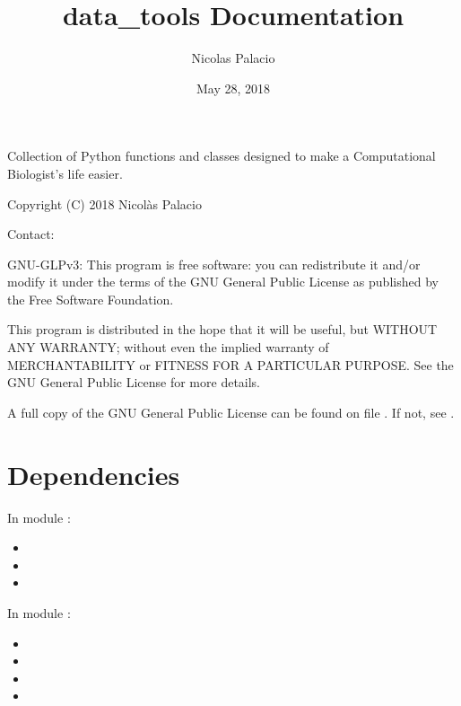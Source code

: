 \documentclass[letterpaper,10pt,english]{sphinxmanual}
\title{data\_tools Documentation}
\date{May 28, 2018}
\author{Nicolas Palacio}
\begin{document}
\maketitle
\sphinxtableofcontents
{}\label{\detokenize{index::doc}}


Collection of Python functions and classes designed to make a
Computational Biologist’s life easier.

Copyright (C) 2018 Nicolàs Palacio

Contact: 

GNU-GLPv3:
This program is free software: you can redistribute it and/or modify it
under the terms of the GNU General Public License as published by the
Free Software Foundation.

This program is distributed in the hope that it will be useful, but
WITHOUT ANY WARRANTY; without even the implied warranty of
MERCHANTABILITY or FITNESS FOR A PARTICULAR PURPOSE. See the GNU General
Public License for more details.

A full copy of the GNU General Public License can be found on file
. If not, see
.


\chapter{Dependencies}
\label{\detokenize{index:dependencies}}\label{\detokenize{index:data-tools-s-reference}}
In module :
\begin{itemize}
\item {} 

\item {} 

\item {} 

\end{itemize}

In module :
\begin{itemize}
\item {} 

\item {} 

\item {} 

\item {} 

\end{itemize}
\end{document}
